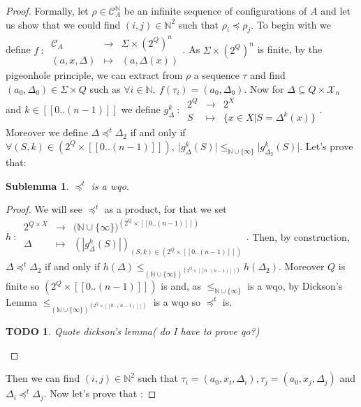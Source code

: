\documentclass[a4paper,10pt]{report}
\newtheorem{slm}{Sublemma}[lm]
\newtheorem{td}{TODO}
\newcommand{\dmap}[5]{
#1~:~\begin{array}{ccccc}
#2 &\to& #3 \\
#4  &\mapsto& #5
\end{array}}
\newcommand{\seg}[1]{[\![#1]\!]}
\newcommand{\ts}{\seg{0 .. (n-1)}}
\newcommand{\C}{\mathcal{C}_{A}}
\newcommand{\X}{\mathcal{X}_{n}}
\begin{document}
\begin {proof}
Formally, let $\rho \in \C^{\mathbb N}$ be an infinite sequence of configurations of $A$ and let us show that we could find $(i,j) \in \mathbb{N}^2$ such that $\rho_i \preceq \rho_j$.
To begin with we define
$\dmap{f}{\C}{\Sigma \times {(2^Q)}^n}{(a,x,\Delta)}{(a,\Delta(x))}$.
As $\Sigma \times {(2^Q)}^n$ is finite, by the pigeonhole principle, we can extract from $\rho$ a sequence $\tau$ and find $(a_0,\Delta_0) \in \Sigma \times Q$ such as 
$\forall i \in \mathbb N,\ f(\tau_i)=(a_0,\Delta_0)$.
Now for $\Delta \subseteq Q \times \X $ and $k \in \ts$ we define $\dmap{g^k_\Delta}{2^Q}{2^X}{S}{\{ x \in X | S=\Delta^k(x) \}} .$
Moreover we define $\Delta \preceq^t \Delta_2$ if and only if $\forall (S,k) \in (2^Q \times \ts) ,\ \lvert g^k_\Delta(S) \lvert \leq_{\mathbb N \cup \{\infty\}} \lvert g^k_{\Delta_2}(S) \lvert$. Let's prove that: 
\begin{slm}
  $\preceq^t$ is a wqo.
\end{slm}
\begin{proof}
We will see $\preceq^t$ as a product, for that we set $ \dmap{h}{2^{Q\times X}}{({\mathbb N \cup \{\infty\})}^{(2^Q \times \ts)}}{\Delta}{(|g^k_{\Delta}(S)|)_{(S,k)\in (2^Q \times \ts)  }}.$
Then, by construction, $\Delta \preceq^t \Delta_2$ if and only if $ h(\Delta) \leq_{{(\mathbb N \cup \{\infty\})}^{(2^Q \times \ts)}} h(\Delta_2)$.
Moreover $Q$ is finite so $(2^Q \times \ts)$ is and, as $\leq_{\mathbb N \cup \{\infty\}}$ is a wqo, by Dickson's Lemma $\leq_{{(\mathbb N \cup \{\infty\})}^{(2^Q \times \ts)}}$
is a wqo so $\preceq^t$ is.
\begin{td}
  Quote dickson's lemma( do I have to prove qo?) 
\end{td}
\end{proof}
Then we can find $(i,j)\in \mathbb{N}^2$ such that $\tau_i=(a_0,x_i,\Delta_i), \tau_j=(a_0,x_j,\Delta_j)$ and $\Delta_i \preceq^t \Delta_j$.
Now let's prove that :


\end{proof}
\end{document}
